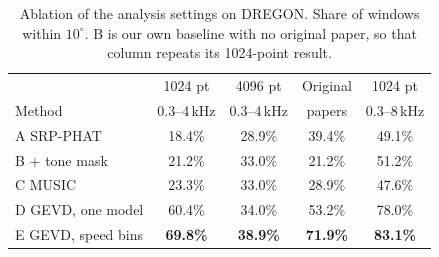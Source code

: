 \begin{table}[t]
\centering
\scriptsize
\setlength{\tabcolsep}{2.4pt}
\begin{tabular}{@{}lcccc@{}}
\toprule
 & 1024 pt & 4096 pt & Original & 1024 pt \\
Method & 0.3--4\,kHz & 0.3--4\,kHz & papers & 0.3--8\,kHz \\
\midrule
A\; SRP-PHAT & 18.4\% & 28.9\% & 39.4\% & 49.1\% \\
B\; + tone mask & 21.2\% & 33.0\% & 21.2\% & 51.2\% \\
C\; MUSIC & 23.3\% & 33.0\% & 28.9\% & 47.6\% \\
D\; GEVD, one model & 60.4\% & 34.0\% & 53.2\% & 78.0\% \\
E\; GEVD, speed bins & \textbf{69.8\%} & \textbf{38.9\%} & \textbf{71.9\%} & \textbf{83.1\%} \\
\bottomrule
\end{tabular}
\caption{Ablation of the analysis settings on DREGON. Share of windows within $10^\circ$. B is our own baseline with no original paper, so that column repeats its 1024-point result.}
\label{tab:ablation}
\end{table}

